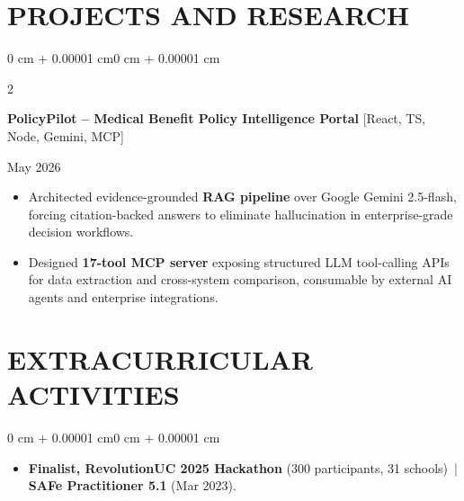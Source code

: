 \documentclass[10pt, letterpaper]{article}
\newenvironment{highlights}{
    \begin{itemize}[
        topsep=0.10 cm,
        parsep=0.06 cm,
        partopsep=0pt,
        itemsep=0.06 cm,
        leftmargin=12pt
    ]
}{
    \end{itemize}
}
\newenvironment{onecolentry}{
    \begin{adjustwidth}{0 cm + 0.00001 cm}{0 cm + 0.00001 cm}
}{
    \end{adjustwidth}
}
\newenvironment{twocolentry}[2][]{
    \onecolentry
    \def\secondColumn{#2}
    \setcolumnwidth{\fill, 4.5 cm}
    \begin{paracol}{2}
}{
    \switchcolumn \raggedleft \secondColumn
    \end{paracol}
    \endonecolentry
}
\begin{document}
\section{PROJECTS AND RESEARCH}
\begin{twocolentry}{May 2026}
\textbf{PolicyPilot -- Medical Benefit Policy Intelligence Portal} [React, TS, Node, Gemini, MCP]
\end{twocolentry}
\begin{highlights}
  \item Architected evidence-grounded \textbf{RAG pipeline} over Google Gemini 2.5-flash, forcing citation-backed answers to eliminate hallucination in enterprise-grade decision workflows.
  \item Designed \textbf{17-tool MCP server} exposing structured LLM tool-calling APIs for data extraction and cross-system comparison, consumable by external AI agents and enterprise integrations.
\end{highlights}

\section{EXTRACURRICULAR ACTIVITIES}
\begin{onecolentry}
\begin{highlights}
  \item \textbf{Finalist, RevolutionUC 2025 Hackathon} (300 participants, 31 schools) \,|\, \textbf{SAFe Practitioner 5.1} (Mar 2023).
\end{highlights}
\end{onecolentry}
\end{document}
